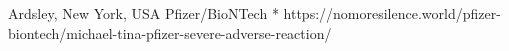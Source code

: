           {Ardsley, New York, USA}
          {}
          {Pfizer/BioNTech}
          {*}
          {
          }
          {https://nomoresilence.world/pfizer-biontech/michael-tina-pfizer-severe-adverse-reaction/}

